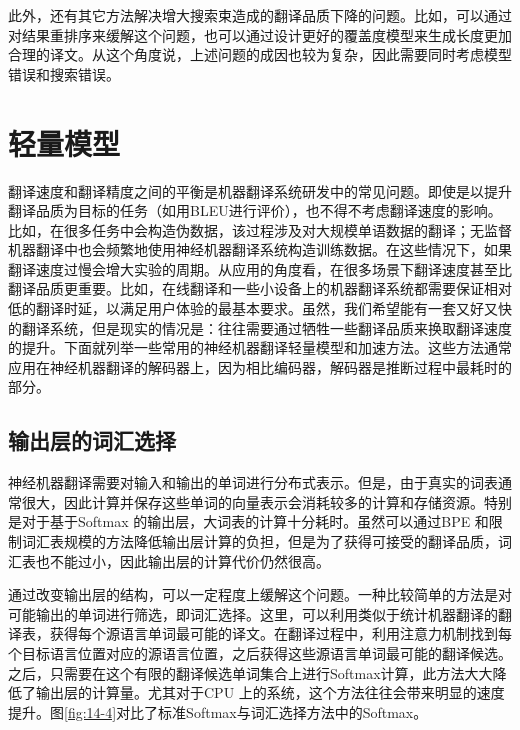 \parinterval 此外，还有其它方法解决增大搜索束造成的翻译品质下降的问题。比如，可以通过对结果重排序来缓解这个问题，也可以通过设计更好的覆盖度模型来生成长度更加合理的译文。从这个角度说，上述问题的成因也较为复杂，因此需要同时考虑模型错误和搜索错误。

\sectionnewpage
\section{轻量模型}\label{sec:14-3}

\parinterval 翻译速度和翻译精度之间的平衡是机器翻译系统研发中的常见问题。即使是以提升翻译品质为目标的任务（如用BLEU进行评价），也不得不考虑翻译速度的影响。比如，在很多任务中会构造伪数据，该过程涉及对大规模单语数据的翻译；无监督机器翻译中也会频繁地使用神经机器翻译系统构造训练数据。在这些情况下，如果翻译速度过慢会增大实验的周期。从应用的角度看，在很多场景下翻译速度甚至比翻译品质更重要。比如，在线翻译和一些小设备上的机器翻译系统都需要保证相对低的翻译时延，以满足用户体验的最基本要求。虽然，我们希望能有一套又好又快的翻译系统，但是现实的情况是：往往需要通过牺牲一些翻译品质来换取翻译速度的提升。下面就列举一些常用的神经机器翻译轻量模型和加速方法。这些方法通常应用在神经机器翻译的解码器上，因为相比编码器，解码器是推断过程中最耗时的部分。


\subsection{输出层的词汇选择}

\parinterval 神经机器翻译需要对输入和输出的单词进行分布式表示。但是，由于真实的词表通常很大，因此计算并保存这些单词的向量表示会消耗较多的计算和存储资源。特别是对于基于Softmax 的输出层，大词表的计算十分耗时。虽然可以通过BPE 和限制词汇表规模的方法降低输出层计算的负担，但是为了获得可接受的翻译品质，词汇表也不能过小，因此输出层的计算代价仍然很高。

\parinterval 通过改变输出层的结构，可以一定程度上缓解这个问题。一种比较简单的方法是对可能输出的单词进行筛选，即词汇选择。这里，可以利用类似于统计机器翻译的翻译表，获得每个源语言单词最可能的译文。在翻译过程中，利用注意力机制找到每个目标语言位置对应的源语言位置，之后获得这些源语言单词最可能的翻译候选。之后，只需要在这个有限的翻译候选单词集合上进行Softmax计算，此方法大大降低了输出层的计算量。尤其对于CPU 上的系统，这个方法往往会带来明显的速度提升。图\ref{fig:14-4}对比了标准Softmax与词汇选择方法中的Softmax。

